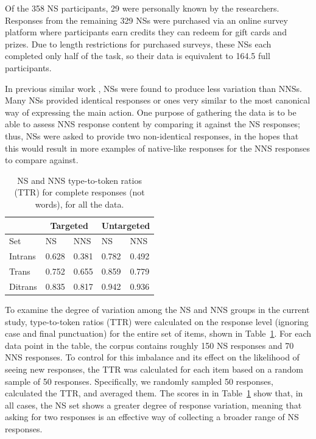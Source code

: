 \documentclass[11pt,a4paper]{article}
\begin{document}
Of the 358 NS participants, 29 were personally known by the researchers. Responses from the remaining 329 NSs were purchased via an online survey platform where participants earn credits they can redeem for gift cards and prizes. Due to length restrictions for purchased surveys, these NSs each completed only half of the task, so their data is equivalent to 164.5 full participants.

In previous similar work \citep{king:dickinson:13},
NSs were found to produce less variation than NNSs. Many NSs provided identical responses or ones very similar to the most canonical way of expressing the main action. One purpose of gathering the data is to be able to assess NNS response content by comparing it against the NS responses; thus, NSs were asked to provide two non-identical responses, in the hopes that this would result in more examples of native-like responses for the NNS responses to compare against.

\begin{table}[htb!]
\begin{center}
\begin{tabular}{|l||l|l||l|l|}
\hline
 & \multicolumn{2}{|c||}{Targeted} & \multicolumn{2}{|c|}{Untargeted} \\
\hline
 Set & NS & NNS & NS & NNS \\
\hline
\hline
Intrans & 0.628 & 0.381 & 0.782 & 0.492 \\
\hline
Trans & 0.752 & 0.655 & 0.859 & 0.779 \\ %
\hline
Ditrans & 0.835 & 0.817 & 0.942 & 0.936 \\ 
\hline
\end{tabular}
\caption{\label{tab:ttr} NS and NNS type-to-token ratios (TTR) for complete responses (not words), for all the data. }
\end{center}
\end{table}

To examine the degree of variation among the NS and NNS groups in the current study, type-to-token ratios (TTR) were calculated on the response level (ignoring case and final punctuation) for the entire set of items, shown in Table~\ref{tab:ttr}. For each data point in the table, the corpus contains roughly 150 NS responses and 70 NNS responses. To control for this imbalance and its effect on the likelihood of seeing new responses, the TTR was calculated for each item based on a random sample of 50 responses.  Specifically, we randomly sampled 50 responses, calculated the TTR, and averaged them. 
The scores in in Table~\ref{tab:ttr} show that, in all cases, the NS set shows a greater degree of response variation, meaning that asking for two responses is an effective way of collecting a broader range of NS responses.
\end{document}
